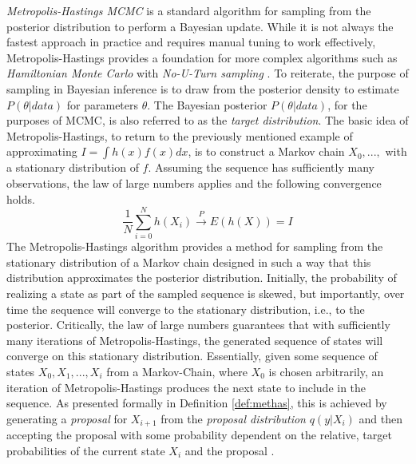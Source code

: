 \documentclass[
  12pt,
  oneside]{book}
\theoremstyle{definition}
\theoremstyle{definition}
\theoremstyle{definition}
\theoremstyle{remark}
\begin{document}
\emph{Metropolis-Hastings MCMC} is a standard algorithm for sampling from the posterior distribution to perform a Bayesian update.
While it is not always the fastest approach in practice and requires manual tuning to work effectively, Metropolis-Hastings provides a foundation for more complex algorithms such as \emph{Hamiltonian Monte Carlo} \citep{Brooks2011} with \emph{No-U-Turn sampling} \citep{Homan2014}.
To reiterate, the purpose of sampling in Bayesian inference is to draw from the posterior density to estimate \(P(\theta|data)\) for parameters \(\theta\).
The Bayesian posterior \(P(\theta|data)\), for the purposes of MCMC, is also referred to as the \emph{target distribution}.
The basic idea of Metropolis-Hastings, to return to the previously mentioned example of approximating \(I=\int h(x)f(x)dx\), is to construct a Markov chain \(X_0,...,\) with a stationary distribution of \(f\).
Assuming the sequence has sufficiently many observations, the law of large numbers applies and the following convergence holds.
\[\frac{1}{N}\sum_{i=0}^{N}h(X_{i})\xrightarrow{P} E(h(X))=I\]
The Metropolis-Hastings algorithm provides a method for sampling from the stationary distribution of a Markov chain designed in such a way that this distribution approximates the posterior distribution.
Initially, the probability of realizing a state as part of the sampled sequence is skewed, but importantly, over time the sequence will converge to the stationary distribution, i.e., to the posterior.
Critically, the law of large numbers guarantees that with sufficiently many iterations of Metropolis-Hastings, the generated sequence of states will converge on this stationary distribution.
Essentially, given some sequence of states \(X_{0},X_{1},...,X_{i}\) from a Markov-Chain, where \(X_{0}\) is chosen arbitrarily, an iteration of Metropolis-Hastings produces the next state to include in the sequence.
As presented formally in Definition \ref{def:methas}, this is achieved by generating a \emph{proposal} for \(X_{i+1}\) from the \emph{proposal distribution} \(q(y|X_{i})\) and then accepting the proposal with some probability dependent on the relative, target probabilities of the current state \(X_{i}\) and the proposal \citep[  24.4]{Wasserman2004}.
\end{document}
